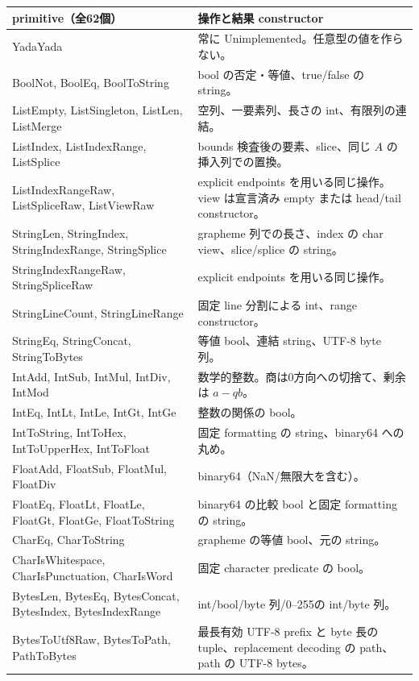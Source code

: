 \documentclass[11pt,a4paper]{article}
\begin{document}
\begin{longtable}{p{}p{}}
\toprule
primitive（全62個） & 操作と結果 constructor \\
\midrule\endhead
YadaYada & 常に Unimplemented。任意型の値を作らない。\\
BoolNot, BoolEq, BoolToString & bool の否定・等値、true/false の string。\\
ListEmpty, ListSingleton, ListLen, ListMerge & 空列、一要素列、長さの int、有限列の連結。\\
ListIndex, ListIndexRange, ListSplice & bounds 検査後の要素、slice、同じ \(A\) の挿入列での置換。\\
ListIndexRangeRaw, ListSpliceRaw, ListViewRaw & explicit endpoints を用いる同じ操作。view は宣言済み empty または head/tail constructor。\\
StringLen, StringIndex, StringIndexRange, StringSplice & grapheme 列での長さ、index の char view、slice/splice の string。\\
StringIndexRangeRaw, StringSpliceRaw & explicit endpoints を用いる同じ操作。\\
StringLineCount, StringLineRange & 固定 line 分割による int、range constructor。\\
StringEq, StringConcat, StringToBytes & 等値 bool、連結 string、UTF-8 byte 列。\\
IntAdd, IntSub, IntMul, IntDiv, IntMod & 数学的整数。商は0方向への切捨て、剰余は \(a-qb\)。\\
IntEq, IntLt, IntLe, IntGt, IntGe & 整数の関係の bool。\\
IntToString, IntToHex, IntToUpperHex, IntToFloat & 固定 formatting の string、binary64 への丸め。\\
FloatAdd, FloatSub, FloatMul, FloatDiv & binary64（NaN/無限大を含む）。\\
FloatEq, FloatLt, FloatLe, FloatGt, FloatGe, FloatToString & binary64 の比較 bool と固定 formatting の string。\\
CharEq, CharToString & grapheme の等値 bool、元の string。\\
CharIsWhitespace, CharIsPunctuation, CharIsWord & 固定 character predicate の bool。\\
BytesLen, BytesEq, BytesConcat, BytesIndex, BytesIndexRange & int/bool/byte 列/0--255の int/byte 列。\\
BytesToUtf8Raw, BytesToPath, PathToBytes & 最長有効 UTF-8 prefix と byte 長の tuple、replacement decoding の path、path の UTF-8 bytes。\\
\bottomrule
\end{longtable}
\end{document}
